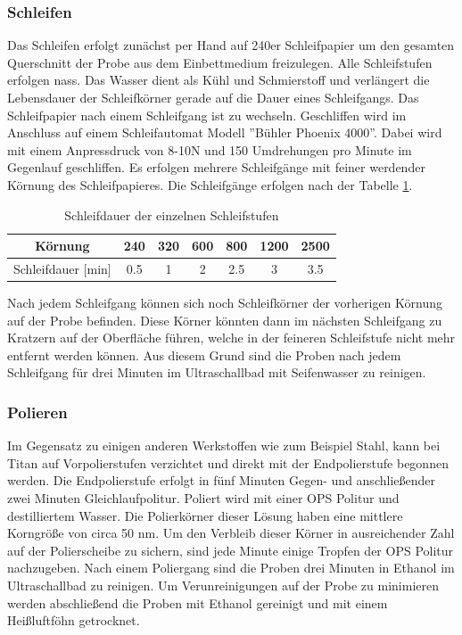 \documentclass[a4paper, 11pt]{tubsreprt}
\begin{document}
\subsubsection{Schleifen}
Das Schleifen erfolgt zunächst per Hand auf 240er Schleifpapier um den gesamten Querschnitt der Probe aus dem Einbettmedium freizulegen. Alle Schleifstufen erfolgen nass. Das Wasser dient als Kühl und Schmierstoff und verlängert die Lebensdauer der Schleifkörner gerade auf die Dauer eines Schleifgangs. Das Schleifpapier nach einem Schleifgang ist zu wechseln. Geschliffen wird im Anschluss auf einem Schleifautomat Modell ''Bühler Phoenix 4000''. Dabei wird mit einem Anpressdruck von 8-10N und 150 Umdrehungen pro Minute im Gegenlauf geschliffen. Es erfolgen mehrere Schleifgänge mit feiner werdender Körnung des Schleifpapieres. Die Schleifgänge erfolgen nach der Tabelle \ref{Tabelle Schleifdauer Körnung}. 
\begin{table}
\begin{tabular}{c|c|c|c|c|c|c}
Körnung & 240 & 320 & 600 & 800 & 1200 & 2500 \\
\hline
Schleifdauer [min] & 0.5 & 1 & 2 & 2.5 & 3 & 3.5 \\
\end{tabular}
\caption{Schleifdauer der einzelnen Schleifstufen}
\label{Tabelle Schleifdauer Körnung}
\end{table}
Nach jedem Schleifgang können sich noch Schleifkörner der vorherigen Körnung auf der Probe befinden. Diese Körner könnten dann im nächsten Schleifgang zu Kratzern auf der Oberfläche führen, welche in der feineren Schleifstufe nicht mehr entfernt werden können. Aus diesem Grund sind die Proben nach jedem Schleifgang für drei Minuten im Ultraschallbad mit Seifenwasser zu reinigen. 

\subsubsection{Polieren}
Im Gegensatz zu einigen anderen Werkstoffen wie zum Beispiel Stahl, kann bei Titan auf Vorpolierstufen verzichtet und direkt mit der Endpolierstufe begonnen werden. Die Endpolierstufe erfolgt in  fünf Minuten Gegen- und anschließender zwei Minuten Gleichlaufpolitur. Poliert wird mit einer OPS Politur und destilliertem Wasser. Die Polierkörner dieser Lösung haben eine mittlere Korngröße von circa 50 nm. Um den Verbleib dieser Körner in ausreichender Zahl auf der Polierscheibe zu sichern, sind jede Minute einige Tropfen der OPS Politur nachzugeben. Nach einem Poliergang sind die Proben drei Minuten in Ethanol im Ultraschallbad zu reinigen. Um Verunreinigungen auf der Probe zu minimieren werden abschließend die Proben mit Ethanol gereinigt und mit einem Heißluftföhn getrocknet.
\end{document}
